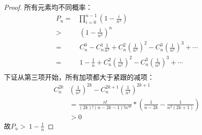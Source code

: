 \begin{proof}
    所有元素均不同概率：
    \begin{align*}
        P_u =& \prod_{i=0}^{n-1} (1-\frac{i}{n^3})\\
            >&~(1-\frac{1}{n^2})^n\\
            =&~C_n^0 - C_n^1\frac{1}{n^2} + C_n^2(\frac{1}{n^2})^2 - C_n^3(\frac{1}{n^2})^3 + \cdots\\
            =&~1-\frac{1}{n} + C_n^2(\frac{1}{n^2})^2 - C_n^3(\frac{1}{n^2})^3 + \cdots\\
    \end{align*}
    下证从第三项开始，所有加项都大于紧跟的减项：\\
    \begin{align*}
        C_n^{2k}&(\frac{1}{n^2})^{2k} - C_n^{2k+1}(\frac{1}{n^2})^{2k+1}\\
        &= \frac{n!}{(2k)!(n-2k-1)!n^{4k}}*(\frac{1}{n-2k}-\frac{1}{n^2(2k+1)})\\
        &> 0
    \end{align*}
    故$P_u>~1-\frac{1}{n}$
\end{proof}